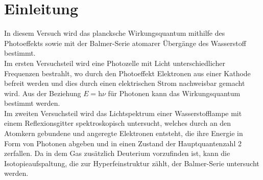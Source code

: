 \section{Einleitung}\label{sec:einleitung}

In diesem Versuch wird das plancksche Wirkungsquantum mithilfe des Photoeffekts
sowie mit der Balmer-Serie atomarer Übergänge des Wasserstoff bestimmt.\\
Im ersten Versuchsteil wird eine Photozelle mit Licht unterschiedlicher Frequenzen 
bestrahlt, wo durch den Photoeffekt Elektronen aus einer Kathode 
befreit werden und dies durch einen elektrischen Strom 
nachweisbar gemacht wird.
Aus der Beziehung $E=\mathrm h\nu$ für Photonen kann das Wirkungsquantum bestimmt werden.\\
Im zweiten Versuchsteil wird das Lichtspektrum einer Wasserstofflampe mit einem
Reflexionsgitter spektroskopisch untersucht, welches durch an den Atomkern gebundene und
angeregte Elektronen entsteht, die ihre Energie in Form von Photonen abgeben 
und in einen Zustand der Hauptquantenzahl 2 zerfallen. Da in dem Gas zusätzlich Deuterium
vorzufinden ist, kann die Isotopieaufspaltung, die zur Hyperfeinstruktur zählt,
der Balmer-Serie untersucht werden.